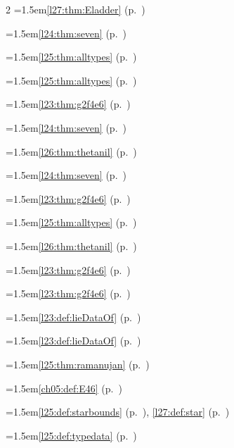 \begin{multicols}{2}
\hangindent=1.5em\quad \ref{l27:thm:Eladder} (p.~\pageref{l27:thm:Eladder})\par
\hangindent=1.5em\quad \ref{l24:thm:seven} (p.~\pageref{l24:thm:seven})\par
\hangindent=1.5em\quad \ref{l25:thm:alltypes} (p.~\pageref{l25:thm:alltypes})\par
\hangindent=1.5em\quad \ref{l25:thm:alltypes} (p.~\pageref{l25:thm:alltypes})\par
\hangindent=1.5em\quad \ref{l23:thm:g2f4e6} (p.~\pageref{l23:thm:g2f4e6})\par
\hangindent=1.5em\quad \ref{l24:thm:seven} (p.~\pageref{l24:thm:seven})\par
\hangindent=1.5em\quad \ref{l26:thm:thetanil} (p.~\pageref{l26:thm:thetanil})\par
\hangindent=1.5em\quad \ref{l24:thm:seven} (p.~\pageref{l24:thm:seven})\par
\hangindent=1.5em\quad \ref{l23:thm:g2f4e6} (p.~\pageref{l23:thm:g2f4e6})\par
\hangindent=1.5em\quad \ref{l25:thm:alltypes} (p.~\pageref{l25:thm:alltypes})\par
\hangindent=1.5em\quad \ref{l26:thm:thetanil} (p.~\pageref{l26:thm:thetanil})\par
\hangindent=1.5em\quad \ref{l23:thm:g2f4e6} (p.~\pageref{l23:thm:g2f4e6})\par
\hangindent=1.5em\quad \ref{l23:thm:g2f4e6} (p.~\pageref{l23:thm:g2f4e6})\par
\hangindent=1.5em\quad \ref{l23:def:lieDataOf} (p.~\pageref{l23:def:lieDataOf})\par
\hangindent=1.5em\quad \ref{l23:def:lieDataOf} (p.~\pageref{l23:def:lieDataOf})\par
\hangindent=1.5em\quad \ref{l25:thm:ramanujan} (p.~\pageref{l25:thm:ramanujan})\par
\hangindent=1.5em\quad \ref{ch05:def:E46} (p.~\pageref{ch05:def:E46})\par
\hangindent=1.5em\quad \ref{l25:def:starbounds} (p.~\pageref{l25:def:starbounds}), \ref{l27:def:star} (p.~\pageref{l27:def:star})\par
\hangindent=1.5em\quad \ref{l25:def:typedata} (p.~\pageref{l25:def:typedata})\par

\end{multicols}
